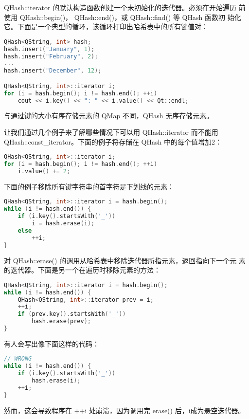 QHash::iterator 的默认构造函数创建一个未初始化的迭代器。必须在开始遍历
前使用 QHash::begin()， QHash::end()，或 QHash::find() 等 QHash 函数初
始化它。下面是一个典型的循环，该循环打印出哈希表中的所有键值对：

\begin{lstlisting}[language=C++]
QHash<QString, int> hash;
hash.insert("January", 1);
hash.insert("February", 2);
...
hash.insert("December", 12);

QHash<QString, int>::iterator i;
for (i = hash.begin(); i != hash.end(); ++i)
    cout << i.key() << ": " << i.value() << Qt::endl;
\end{lstlisting}

与通过键的大小有序存储元素的 QMap 不同，QHash 无序存储元素。

让我们通过几个例子来了解哪些情况下可以用 QHash::iterator 而不能用 QHash::const\_iterator。下面的例子将存储在 QHash 中的每个值增加2：

\begin{lstlisting}[language=C++]
QHash<QString, int>::iterator i;
for (i = hash.begin(); i != hash.end(); ++i)
    i.value() += 2;
\end{lstlisting}

下面的例子移除所有键字符串的首字符是下划线的元素：

\begin{lstlisting}[language=C++]
QHash<QString, int>::iterator i = hash.begin();
while (i != hash.end()) {
    if (i.key().startsWith('_'))
        i = hash.erase(i);
    else
        ++i;
}
\end{lstlisting}

对 QHash::erase() 的调用从哈希表中移除迭代器所指元素，返回指向下一个元
素的迭代器。下面是另一个在遍历时移除元素的方法：

\begin{lstlisting}[language=C++]
QHash<QString, int>::iterator i = hash.begin();
while (i != hash.end()) {
    QHash<QString, int>::iterator prev = i;
    ++i;
    if (prev.key().startsWith('_'))
        hash.erase(prev);
}
\end{lstlisting}

有人会写出像下面这样的代码：

\begin{lstlisting}[language=C++]
// WRONG
while (i != hash.end()) {
    if (i.key().startsWith('_'))
        hash.erase(i);
    ++i;
}
\end{lstlisting}

然而，这会导致程序在 ++i 处崩溃，因为调用完 erase() 后，i成为悬空迭代器。

